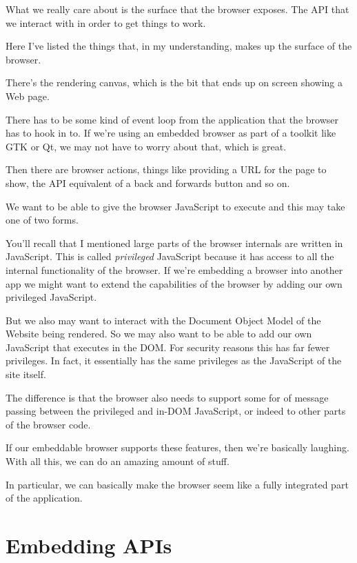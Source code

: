 \documentclass{article}
\begin{document}
What we really care about is the surface that the browser exposes. The API that we interact with in order to get things to work.

Here I've listed the things that, in my understanding, makes up the surface of the browser.

There's the rendering canvas, which is the bit that ends up on screen showing a Web page.

There has to be some kind of event loop from the application that the browser has to hook in to. If we're using an embedded browser as part of a toolkit like GTK or Qt, we may not have to worry about that, which is great.

Then there are browser actions, things like providing a URL for the page to show, the API equivalent of a back and forwards button and so on.

We want to be able to give the browser JavaScript to execute and this may take one of two forms.

You'll recall that I mentioned large parts of the browser internals are written in JavaScript. This is called {\it privileged\/} JavaScript because it has access to all the internal functionality of the browser. If we're embedding a browser into another app we might want to extend the capabilities of the browser by adding our own privileged JavaScript.

But we also may want to interact with the Document Object Model of the Website being rendered. So we may also want to be able to add our own JavaScript that executes in the DOM. For security reasons this has far fewer privileges. In fact, it essentially has the same privileges as the JavaScript of the site itself.

The difference is that the browser also needs to support some for of message passing between the privileged and in-DOM JavaScript, or indeed to other parts of the browser code.

If our embeddable browser supports these features, then we're basically laughing. With all this, we can do an amazing amount of stuff.

In particular, we can basically make the browser seem like a fully integrated part of the application.


\section{Embedding APIs}
\end{document}

